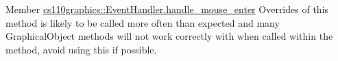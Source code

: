 \label{bug__bug000001}
\hypertarget{bug__bug000001}{}
 
\begin{DoxyDescription}
\item[Member \hyperlink{classcs110graphics_1_1EventHandler_a13af3268f8a1aa36b8483eb2deffef15}{cs110graphics::EventHandler.handle\_\-mouse\_\-enter} ]Overrides of this method is likely to be called more often than expected and many GraphicalObject methods will not work correctly with when called within the method, avoid using this if possible.


\end{DoxyDescription}